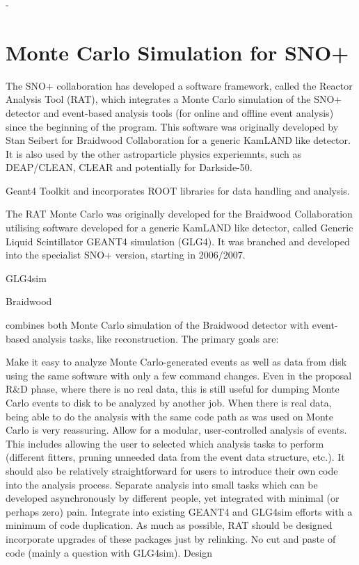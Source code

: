 -

\section{Monte Carlo Simulation for SNO+}
The SNO+ collaboration has developed a software framework, called the Reactor Analysis
Tool (RAT), which integrates a Monte Carlo simulation of the SNO+ detector and event-based analysis tools (for online and offline event analysis) since the beginning of the program. This software was originally developed by Stan Seibert for Braidwood Collaboration for a generic KamLAND like detector. It is also used by the other astroparticle physics experiemnts, such as DEAP/CLEAN, CLEAR and potentially for Darkside-50.







Geant4 Toolkit and
incorporates ROOT libraries for data handling and analysis.



The RAT Monte Carlo was originally developed for the Braidwood Collaboration
utilising software developed for a generic KamLAND like detector, called Generic Liquid Scintillator GEANT4 simulation (GLG4). It was branched and
developed into the specialist SNO+ version, starting in 2006/2007.

GLG4sim


Braidwood






 combines both Monte Carlo simulation of the Braidwood detector with event-based analysis tasks, like reconstruction. The primary goals are:

Make it easy to analyze Monte Carlo-generated events as well as data from disk using the same software with only a few command changes. Even in the proposal R\&D phase, where there is no real data, this is still useful for dumping Monte Carlo events to disk to be analyzed by another job. When there is real data, being able to do the analysis with the same code path as was used on Monte Carlo is very reassuring.
Allow for a modular, user-controlled analysis of events. This includes allowing the user to selected which analysis tasks to perform (different fitters, pruning unneeded data from the event data structure, etc.). It should also be relatively straightforward for users to introduce their own code into the analysis process.
Separate analysis into small tasks which can be developed asynchronously by different people, yet integrated with minimal (or perhaps zero) pain.
Integrate into existing GEANT4 and GLG4sim efforts with a minimum of code duplication. As much as possible, RAT should be designed incorporate upgrades of these packages just by relinking. No cut and paste of code (mainly a question with GLG4sim).
Design\cite{ratManual}





